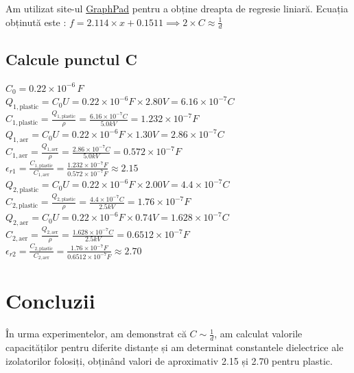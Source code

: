 \documentclass[12pt]{article}
\begin{document}
Am utilizat site-ul \href{https://www.graphpad.com}{GraphPad} pentru a obține dreapta de regresie liniară. Ecuația obținută este : $f = 2.114 \times x + 0.1511 \implies 2 \times C \approx \frac{1}{d}$\\

\subsection{Calcule punctul C}

$C_{0} = 0.22 \times 10^{-6} \, F$\\
$Q_{1,\text{plastic}} = C_{0}U = 0.22 \times 10^{-6}F \times 2.80V = 6.16 \times 10^{-7}C$\\
$C_{1,\text{plastic}} = \frac{Q_{1,\text{plastic}}}{\rho} = \frac{6.16 \times 10^{-7}C}{5.0kV} = 1.232 \times 10^{-7}F$\\
$Q_{1,\text{aer}} = C_{0}U = 0.22 \times 10^{-6}F \times 1.30V = 2.86 \times 10^{-7}C$\\
$C_{1,\text{aer}} = \frac{Q_{1,\text{aer}}}{\rho} = \frac{2.86 \times 10^{-7}C}{5.0kV} = 0.572 \times 10^{-7}F$\\
$\epsilon_{r1} = \frac{C_{1,\text{plastic}}}{C_{1,\text{aer}}} = \frac{1.232 \times 10^{-7}F}{0.572 \times 10^{-7}F} \approx 2.15$\\
$Q_{2,\text{plastic}} = C_{0}U = 0.22 \times 10^{-6}F \times 2.00V = 4.4 \times 10^{-7}C$\\
$C_{2,\text{plastic}} = \frac{Q_{2,\text{plastic}}}{\rho} = \frac{4.4 \times 10^{-7}C}{2.5kV} = 1.76 \times 10^{-7}F$\\
$Q_{2,\text{aer}} = C_{0}U = 0.22 \times 10^{-6}F \times 0.74V = 1.628 \times 10^{-7}C$\\
$C_{2,\text{aer}} = \frac{Q_{2,\text{aer}}}{\rho} = \frac{1.628 \times 10^{-7}C}{2.5kV} = 0.6512 \times 10^{-7}F$\\
$\epsilon_{r2} = \frac{C_{2,\text{plastic}}}{C_{2,\text{aer}}} = \frac{1.76 \times 10^{-7}F}{0.6512 \times 10^{-7}F} \approx 2.70$\\

\section{Concluzii}

În urma experimentelor, am demonstrat că \( C \sim \frac{1}{d} \), am calculat valorile capacităților pentru diferite distanțe și am determinat constantele dielectrice ale izolatorilor folosiți, obținând valori de aproximativ 2.15 și 2.70 pentru plastic.
\end{document}
